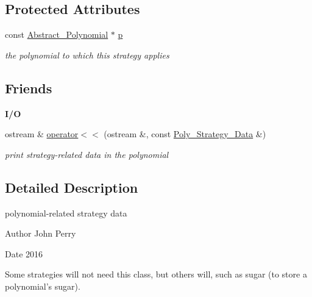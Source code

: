 \subsection*{Protected Attributes}
\begin{DoxyCompactItemize}
\item 
\mbox{\label{class_poly___strategy___data_a2fdcdbe5f8ea3ae93c5a55a9775e6e6f}} 
const \hyperlink{class_abstract___polynomial}{Abstract\+\_\+\+Polynomial} $\ast$ \hyperlink{class_poly___strategy___data_a2fdcdbe5f8ea3ae93c5a55a9775e6e6f}{p}
\begin{DoxyCompactList}\small\item\em the polynomial to which this strategy applies \end{DoxyCompactList}\end{DoxyCompactItemize}
\subsection*{Friends}
\begin{Indent}\textbf{ I/O}\par
\begin{DoxyCompactItemize}
\item 
\mbox{\label{class_poly___strategy___data_a10f553f550739a68fe90fa3318942134}} 
ostream \& \hyperlink{class_poly___strategy___data_a10f553f550739a68fe90fa3318942134}{operator$<$$<$} (ostream \&, const \hyperlink{class_poly___strategy___data}{Poly\+\_\+\+Strategy\+\_\+\+Data} \&)
\begin{DoxyCompactList}\small\item\em print strategy-\/related data in the polynomial \end{DoxyCompactList}\end{DoxyCompactItemize}
\end{Indent}


\subsection{Detailed Description}
polynomial-\/related strategy data 

\begin{DoxyAuthor}{Author}
John Perry 
\end{DoxyAuthor}
\begin{DoxyDate}{Date}
2016
\end{DoxyDate}
Some strategies will not need this class, but others will, such as sugar (to store a polynomial's sugar). 

